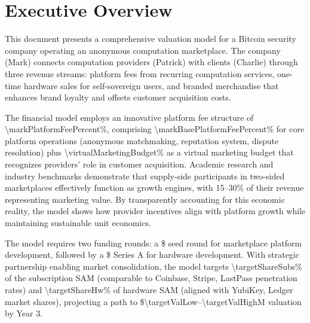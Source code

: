 
\section*{Executive Overview}
This document presents a comprehensive valuation model for a Bitcoin security company operating an anonymous computation marketplace. The company (Mark) connects computation providers (Patrick) with clients (Charlie) through three revenue streams: platform fees from recurring computation services, one-time hardware sales for self-sovereign users, and branded merchandise that enhances brand loyalty and offsets customer acquisition costs. 

The financial model employs an innovative platform fee structure of \num{\markPlatformFeePercent}\%, comprising \num{\markBasePlatformFeePercent}\% for core platform operations (anonymous matchmaking, reputation system, dispute resolution) plus \num{\virtualMarketingBudget}\% as a virtual marketing budget that recognizes providers' role in customer acquisition. Academic research\cite{eisenmann2006} and industry benchmarks\cite{andreessen2020,bvp2023} demonstrate that supply-side participants in two-sided marketplaces effectively function as growth engines, with \num{15}--\num{30}\% of their revenue representing marketing value. By transparently accounting for this economic reality, the model shows how provider incentives align with platform growth while maintaining sustainable unit economics.

The model requires two funding rounds: a \$\numint{\seedAmount} seed round for marketplace platform development, followed by a \$\numint{\seriesAAmount} Series A for hardware development. With strategic partnership enabling market consolidation, the model targets \num{\targetShareSubs}\% of the subscription SAM (comparable to Coinbase, Stripe, LastPass penetration rates) and \num{\targetShareHw}\% of hardware SAM (aligned with YubiKey, Ledger market shares), projecting a path to \$\num{\targetValLow}--\num{\targetValHigh}M valuation by Year \num{3}.
